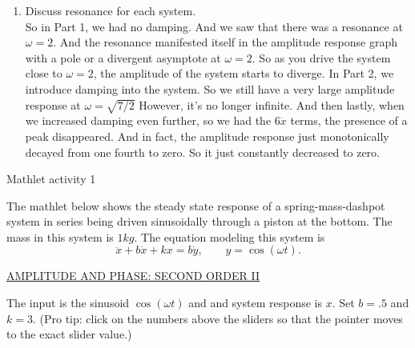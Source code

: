 \begin{enumerate}[label=\textbf{Part.\arabic*}]
\item Discuss resonance for each system. \\
  So in Part 1, we had no damping.
  And we saw that there was a resonance at $\omega =  2$.
  And the resonance manifested itself in the amplitude response graph with a pole
  or a divergent asymptote at $\omega = 2$.
  So as you drive the system close to $\omega = 2$,
  the amplitude of the system starts to diverge.
  In Part 2, we introduce damping into the system.
  So we still have a very large amplitude response at $ \omega = \sqrt{7/2}$
  However, it's no longer infinite.
  And then lastly, when we increased damping even further,
  so we had the $6 \dot x$ terms, the presence of a peak disappeared.
  And in fact, the amplitude response  just monotonically decayed from one fourth to zero.
  So it just constantly decreased to zero.
\end{enumerate}

\begin{exercise}
  Mathlet activity 1
\end{exercise}

The mathlet below shows the steady state response of a spring-mass-dashpot system in series being driven sinusoidally through a piston at the bottom.
The mass in this system is $1kg$. The equation modeling this system is
\begin{equation*}
  \ddot x + b\dot x + k x = b\dot y, \qquad y = \cos (\omega t).
\end{equation*}

\href{http://mathlets.org/mathlets/amplitude-and-phase-2nd-order-ii/}
{AMPLITUDE AND PHASE: SECOND ORDER II}

The input is the sinusoid $\cos (\omega t)$ and and system response is $x$.
Set $b=.5$ and $k=3$.
(Pro tip: click on the numbers above the sliders so that the pointer moves to the exact slider value.)\\


